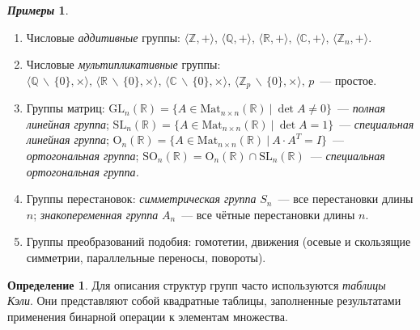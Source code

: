\documentclass[a4paper, 14pt]{extarticle}
\newcommand{\integers}{\mathbb{Z}}
\newcommand{\rationals}{\mathbb{Q}}
\newcommand{\real}{\mathbb{R}}
\newcommand{\complex}{\mathbb{C}}
\newcommand{\GL}{\mathrm{GL}}
\newcommand{\SL}{\mathrm{SL}}
\newcommand{\Orth}{\mathrm{O}}
\newcommand{\SOrth}{\mathrm{SO}}
\theoremstyle{definition}
\newtheorem*{exmpls}{\textit{Примеры}}
\newtheorem{definition}{Определение}
\theoremstyle{plain}
\numberwithin{theorem}{section}
\numberwithin{definition}{section}
\numberwithin{statement}{section}
\numberwithin{lemma}{section}
\numberwithin{consequence}{section}
\begin{document}
		\begin{exmpls}
			\
			\begin{enumerate}
				\setlength\itemsep{0.1em}
				\item Числовые \textit{аддитивные} группы: \newline
				$\langle \integers, + \rangle, \, \langle \rationals, + \rangle, \, 
				\langle \real, + \rangle, \,
				\langle \complex, + \rangle, \, 
				\langle \integers_n, + \rangle.$ 
				\item Числовые \textit{мультипликативные} группы: \newline
				$\langle \rationals \, \backslash \, \{0\}, \times \rangle, \,
				\langle \real \, \backslash \, \{0\}, \times \rangle, \,
				\langle \complex \, \backslash \, \{0\}, \times \rangle, \,
				\langle \integers_p \, \backslash \, \{0\}, \times \rangle, \, p$~--- простое.
				\item Группы матриц: \newline
				${\GL_n(\real) = \{A \in \mathrm{Mat}_{n \times n}(\real) \ | \ \det A \neq 0 \}}$~--- \textit{полная линейная группа}; \newline
				${\SL_n(\real) = \{A \in \mathrm{Mat}_{n \times n}(\real) \ | \ \det A = 1 \}}$~--- \textit{специальная линейная
				группа}; \newline
				${\Orth_n(\real)} = \{A \in \mathrm{Mat}_{n \times n}(\real) \ | \ A \cdot A^T = I\}$~--- \textit{ортогональная группа}; \newline
				${\SOrth_n(\real) = \Orth_n(\real) \cap \SL_n(\real)}$~--- \textit{специальная ортогональная группа.}
				\item Группы перестановок: \newline
				\textit{симметрическая группа} $S_n$~--- все перестановки длины $n$;\newline
				\textit{знакопеременная группа} $A_n$~--- все чётные перестановки длины $n$.
				\item Группы преобразований подобия: гомотетии, движения (осевые и скользящие симметрии, параллельные переносы, повороты).
			\end{enumerate}
		\end{exmpls}
		\begin{definition}
			Для описания структур групп часто используются \textit{таблицы Кэли}. Они представляют собой квадратные таблицы, заполненные результатами применения бинарной операции к элементам множества.
		\end{definition}
\end{document}
